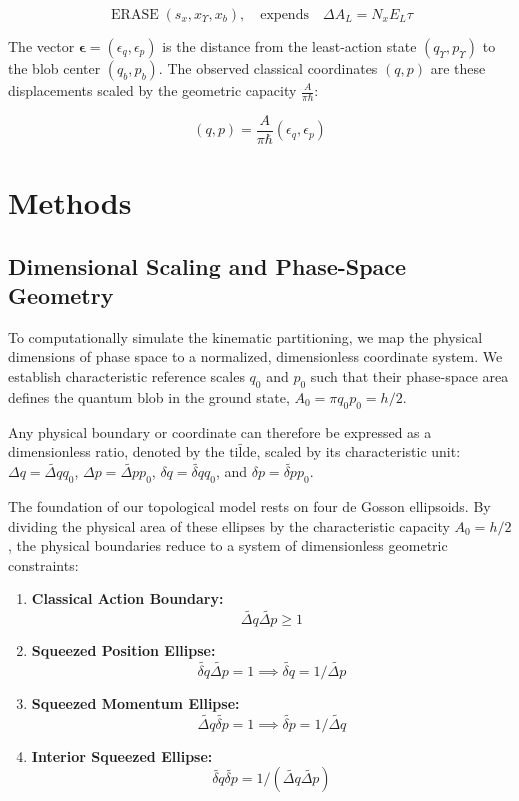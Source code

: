 \documentclass[%
  aps, reprint, prl, amsmath,amssymb
]{revtex4-2}
\begin{document}
\begin{equation}
\label{eq:ErasureFunction}
\operatorname{ERASE}(s_x, x_\Upsilon, x_b), \quad \text{expends} \quad \Delta A_L = N_x E_L \tau
\end{equation}

The vector $\mathbf{\epsilon} = (\epsilon_q,\epsilon_p)$ is the distance from the least-action state $(q_\Upsilon, p_\Upsilon)$ to the blob center $(q_b, p_b)$. The observed classical coordinates $(q,p)$ are these displacements scaled by the geometric capacity $\frac{A}{\pi \hbar}$:

\begin{equation}
\label{eq:ObservedCoordinates}
(q,p) = \frac{A}{\pi \hbar} (\epsilon_q,\epsilon_p)
\end{equation}

\section{Methods}

\subsection{Dimensional Scaling and Phase-Space Geometry}

To computationally simulate the kinematic partitioning, we map the physical dimensions of phase space to a normalized, dimensionless coordinate system. We establish characteristic reference scales $q_0$ and $p_0$ such that their phase-space area defines the quantum blob in the ground state, $A_0 = \pi q_0 p_0 = h/2$.

Any physical boundary or coordinate can therefore be expressed as a dimensionless ratio, denoted by the $\widetilde{\text{tilde}}$, scaled by its characteristic unit: $\Delta q = \widetilde{\Delta q} q_0$, $\Delta p = \widetilde{\Delta p} p_0$, $\delta q = \widetilde{\delta q} q_0$, and $\delta p = \widetilde{\delta p} p_0$.

The foundation of our topological model rests on four de Gosson ellipsoids. By dividing the physical area of these ellipses by the characteristic capacity $A_0 = h/2$, the physical boundaries reduce to a system of dimensionless geometric constraints:
\begin{enumerate}
    \item \textbf{Classical Action Boundary:} $$\widetilde{\Delta q} \widetilde{\Delta p} \ge 1$$    
    \item \textbf{Squeezed Position Ellipse:} $$\widetilde{\delta q} \widetilde{\Delta p} = 1 \implies \widetilde{\delta q} = 1 / \widetilde{\Delta p}$$
    \item \textbf{Squeezed Momentum Ellipse:} $$\widetilde{\Delta q} \widetilde{\delta p} = 1 \implies \widetilde{\delta p} = 1 / \widetilde{\Delta q}$$
    \item \textbf{Interior Squeezed Ellipse:} $$\widetilde{\delta q} \widetilde{\delta p} = 1 / (\widetilde{\Delta q} \widetilde{\Delta p})$$
\end{enumerate}
\end{document}
